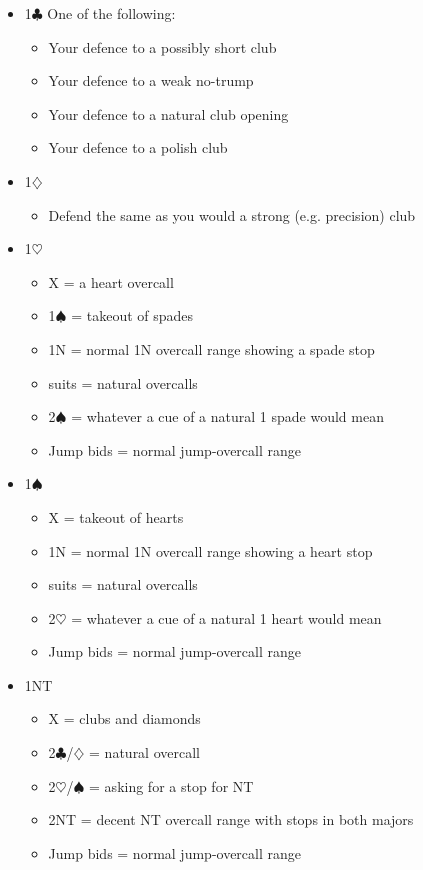 \documentclass[a4paper,14pt]{extarticle}
\begin{document}
\begin{itemize}
\item 1$\clubsuit$
	One of the following:
	\begin{itemize}
	\item Your defence to a possibly short club
	\item Your defence to a weak no-trump
	\item Your defence to a natural club opening 
	\item Your defence to a polish club
	\end{itemize}
\item 1$\diamondsuit$
	\begin{itemize}
	\item Defend the same as you would a strong (e.g. precision) club
	\end{itemize}
\item 1$\heartsuit$
	\begin{itemize}
	\item X = a heart overcall
	\item 1$\spadesuit$ = takeout of spades
	\item 1N = normal 1N overcall range showing a spade stop
	\item suits = natural overcalls
	\item 2$\spadesuit$ = whatever a cue of a natural 1 spade would mean 
	\item Jump bids = normal jump-overcall range
	\end{itemize}
\item 1$\spadesuit$
	\begin{itemize}
	\item X = takeout of hearts
	\item 1N = normal 1N overcall range showing a heart stop
	\item suits = natural overcalls
	\item 2$\heartsuit$ = whatever a cue of a natural 1 heart would mean 
	\item Jump bids = normal jump-overcall range
	\end{itemize}

\newpage

\item 1NT
	\begin{itemize}
	\item X = clubs and diamonds
	\item 2$\clubsuit$/$\diamondsuit$ = natural overcall
	\item 2$\heartsuit$/$\spadesuit$ = asking for a stop for NT
	\item 2NT = decent NT overcall range with stops in both majors
	\item Jump bids = normal jump-overcall range
	\end{itemize}
\end{itemize}
\end{document}
